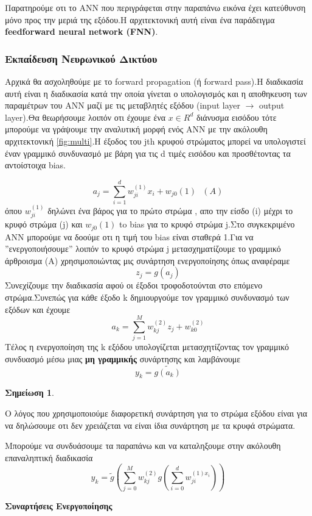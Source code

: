 \documentclass[12pt,a4paper]{article}
\newtheorem{note}{Σημείωση}
\begin{document}
Παρατηρούμε οτι το ANN που περιγράφεται στην παραπάνω εικόνα έχει κατεύθυνση μόνο προς την μεριά της εξόδου.Η αρχιτεκτονική αυτή είναι ένα παράδειγμα \textbf{feedforward neural network (FNN)}.


\subsubsection{Εκπαίδευση Νευρωνικού Δικτύου}
Αρχικά θα ασχοληθούμε με το forward propagation (ή forward pass).Η διαδικασία αυτή είναι η διαδικασία κατά την οποία γίνεται ο υπολογισμός και η αποθηκευση των παραμέτρων του ANN μαζί με τις μεταβλητές εξόδου (input layer $\to$ output layer).Θα θεωρήσουμε λοιπόν οτι έχουμε ένα $x \in R^d$ διάνυσμα εισόδου  τότε μπορούμε να γράψουμε την αναλυτική μορφή ενός ANN με την ακόλουθη αρχιτεκτονική \ref{fig:multi}.H έξοδος του jth κρυφού στρώματος μπορεί να υπολογιστεί έναν γραμμικό συνδυνασμό με βάρη για τις d τιμές εισόδου και προσθέτοντας τα αντοίστοιχα bias.

$$a_j = \sum_{i=1}^d w_{ji}^(1)x_i + w_{j0}(1) \ \ \ (A)$$
όπου  $ w_{ji}^(1) $ δηλώνει ένα βάρος για το πρώτο στρώμα , απο την είσδο (i) μέχρι το κρυφό στρώμα (j) και $ w_{j0}(1)$ to bias για το κρυφό στρώμα j.Στο συγκεκριμένο ANN μπορούμε να δοούμε οτι η τιμή του bias είναι σταθερά 1.Για να ''ενεργοποιήσουμε'' λοιπόν το κρυφό στρώμα j μετασχηματίζουμε το γραμμικό άρθροισμα (A) χρησιμοποιώντας μις συνάρτηση ενεργοποίησης όπως αναφέραμε
$$z_j =g(a_j)$$
Συνεχίζουμε την διαδικασία αφού οι έξοδοι τροφοδοτούνται στο επόμενο στρώμα.Συνεπώς για κάθε έξοδο k δημιουργούμε τον γραμμικό συνδυνασμό των εξόδων και έχουμε
$$a_k = \sum_{j=1}^M w_{kj}^{(2)}z_j + w_{k0}^{(2)}$$
Τέλος η ενεργοποίηση της k εξόδου υπολογίζεται μετασχητίζοντας τον γραμμικό συνδυασμό μέσω μιας \textbf{μη γραμμικής} συνάρτησης και λαμβάνουμε
$$y_k =\tilde{g(a_k)}$$
\begin{note}

\end{note}
Ο λόγος που χρησιμοποιούμε διαφορετική συνάρτηση για το στρώμα εξόδου είναι για να δηλώσουμε οτι δεν χρειάζεται να είναι ίδια συνάρτηση με τα κρυφά στρώματα.

Μπορούμε να συνδυάσουμε τα παραπάνω και να καταληξουμε στην ακόλουθη επαναληπτική διαδικασία
$$y_k = \tilde{g}(\sum_{j=0}^M w_{kj}^{(2)}g(\sum_{i=0}^d w_{ji}^{(1)x_i}))$$


\textbf{Συναρτήσεις Ενεργοποίησης}
\end{document}
